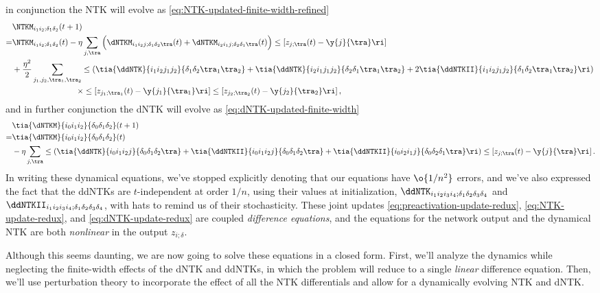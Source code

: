 in conjunction the NTK will evolve as \eqref{eq:NTK-updated-finite-width-refined}
\begin{align}\label{eq:NTK-update-redux}
&\NTKM_{i_1i_2;\delta_1\delta_2}(t+1) \, \\
=&\NTKM_{i_1i_2;\delta_1\delta_2}(t)-\eta\sum_{j,\tra}\Big(\dNTKM_{i_1 i_2j;\delta_1\delta_2\tra}(t)+\dNTKM_{i_2 i_1j;\delta_2\delta_1\tra}(t)\Big)\le[z_{j;\tra}(t)-\y{j}{\tra}\ri]\, \notag\\
&+\frac{\eta^2}{2}\sum_{j_1,j_2,\tra_1,\tra_2}\le(\tia{\ddNTK}{i_1i_2j_1j_2}{\delta_1\delta_2\tra_1\tra_2}+\tia{\ddNTK}{i_2i_1j_1j_2}{\delta_2\delta_1\tra_1\tra_2} + 2\tia{\ddNTKII}{i_1i_2j_1j_2}{\delta_1\delta_2\tra_1\tra_2} \ri) \, \notag\\ 
&\qquad\qquad\qquad\qquad\times\le[z_{j_1;\tra_1}(t)-\y{j_1}{\tra_1}\ri]\le[z_{j_2;\tra_2}(t)-\y{j_2}{\tra_2}\ri] \notag
\, , 
\end{align}
and in further conjunction the dNTK will evolve as \eqref{eq:dNTK-updated-finite-width}
\begin{align}\label{eq:dNTK-update-redux}
&\tia{\dNTKM}{i_0i_1i_2}{\delta_0\delta_1\delta_2}(t+1) \, \\
=&\tia{\dNTKM}{i_0i_1i_2}{\delta_0\delta_1\delta_2}(t) \, \notag \\
&-\eta\sum_{j,\tra}\le(\tia{\ddNTK}{i_0i_1 i_2j}{\delta_0\delta_1\delta_2\tra}+\tia{\ddNTKII}{i_0i_1 i_2j}{\delta_0\delta_1\delta_2\tra}+\tia{\ddNTKII}{i_0i_2 i_1j}{\delta_0\delta_2\delta_1\tra}\ri)\le[z_{j;\tra}(t)-\y{j}{\tra}\ri]\,\notag .
\end{align}
In writing these dynamical equations, we've stopped explicitly denoting that our equations have $\o{1/n^2}$ errors, and we've also expressed the fact that the ddNTKs are $t$-independent at order $1/n$, using their values at initialization, $\ddNTK_{i_1 i_2i_3i_4;\delta_1\delta_2\delta_3\delta_4}$ and $\ddNTKII_{i_1 i_2i_3i_4;\delta_1\delta_2\delta_3\delta_4}$, with hats to remind us of their stochasticity.
These joint updates \eqref{eq:preactivation-update-redux}, \eqref{eq:NTK-update-redux}, and \eqref{eq:dNTK-update-redux} are coupled \emph{difference equations}, and the equations for the network output and the dynamical NTK are both \emph{nonlinear} in the output $z_{i;\delta}$. 

Although this seems daunting, we are now going to solve these equations in a closed form. First, we'll analyze the dynamics while neglecting the finite-width effects of the dNTK and ddNTKs, in which the problem will reduce to a single \emph{linear} difference equation. Then, we'll use perturbation theory to incorporate the effect of all the NTK differentials and allow for a dynamically evolving NTK and dNTK.








